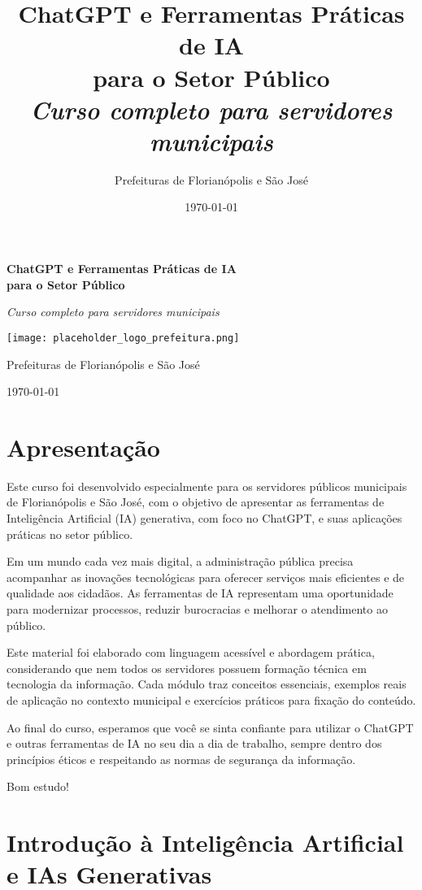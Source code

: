 \documentclass[12pt,a4paper]{book}
\title{\Huge\textbf{ChatGPT e Ferramentas Práticas de IA\\para o Setor Público}\\
\Large\textit{Curso completo para servidores municipais}}
\author{Prefeituras de Florianópolis e São José}
\date{\today}
\begin{document}
\frontmatter
\begin{titlepage}
\centering
\vspace*{2cm}
{\Huge\textbf{ChatGPT e Ferramentas Práticas de IA\\para o Setor Público}\par}
\vspace{1.5cm}
{\Large\textit{Curso completo para servidores municipais}\par}
\vspace{2cm}
\texttt{[image: placeholder\_logo\_prefeitura.png]}
\vfill
{\large Prefeituras de Florianópolis e São José\par}
{\large\today\par}
\end{titlepage}

\tableofcontents

\chapter*{Apresentação}

Este curso foi desenvolvido especialmente para os servidores públicos municipais de Florianópolis e São José, com o objetivo de apresentar as ferramentas de Inteligência Artificial (IA) generativa, com foco no ChatGPT, e suas aplicações práticas no setor público.

Em um mundo cada vez mais digital, a administração pública precisa acompanhar as inovações tecnológicas para oferecer serviços mais eficientes e de qualidade aos cidadãos. As ferramentas de IA representam uma oportunidade para modernizar processos, reduzir burocracias e melhorar o atendimento ao público.

Este material foi elaborado com linguagem acessível e abordagem prática, considerando que nem todos os servidores possuem formação técnica em tecnologia da informação. Cada módulo traz conceitos essenciais, exemplos reais de aplicação no contexto municipal e exercícios práticos para fixação do conteúdo.

Ao final do curso, esperamos que você se sinta confiante para utilizar o ChatGPT e outras ferramentas de IA no seu dia a dia de trabalho, sempre dentro dos princípios éticos e respeitando as normas de segurança da informação.

Bom estudo!

\mainmatter

\chapter{Introdução à Inteligência Artificial e IAs Generativas}
\end{document}
